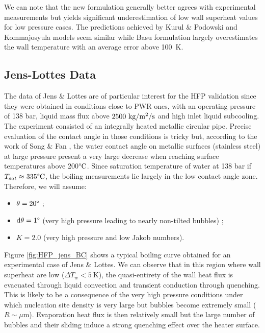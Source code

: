 \npar
We can note that the new formulation generally better agrees with experimental measurements but yields significant underestimation of low wall superheat values for low pressure cases. The predictions achieved by Kurul \& Podowski and Kommajosyula models seem similar while Basu \etal formulation largely overestimates the wall temperature with an average error above 100~K. 




\subsection{Jens-Lottes Data}
\label{subsec:HFP_verif_Jens}

The data of Jens \& Lottes are of particular interest for the HFP validation since they were obtained in conditions close to PWR ones, with an operating pressure of 138 bar, liquid mass flux above $2500\ \text{kg/m$^{2}$/s}$ and high inlet liquid subcooling. The experiment consisted of an integrally heated metallic circular pipe. Precise evaluation of the contact angle in those conditions is tricky but, according to the work of Song \& Fan \cite{song_temperature_2021}, the water contact angle on metallic surfaces (\eg stainless steel) at large pressure present a very large decrease when reaching surface temperatures above 200$\degree\mathrm{C}$. Since saturation temperature of water at 138 bar if $T_{sat} \approx 335 \degree\mathrm{C}$, the boiling measurements lie largely in the low contact angle zone. Therefore, we will assume:

\begin{itemize}
\item $\theta = 20 \degree$ ;
\item $\mathrm{d}\theta = 1 \degree$ (very high pressure leading to nearly non-tilted bubbles) ;
\item $K = 2.0$ (very high pressure and low Jakob numbers).
\end{itemize}


Figure \ref{fig:HFP_jens_BC} shows a typical boiling curve obtained for an experimental case of Jens \& Lottes. We can observe that in this region where wall superheat are low ($\Delta T_{w}<5\ $K), the quasi-entirety of the wall heat flux is evacuated through liquid convection and transient conduction through quenching. This is likely to be a consequence of the very high pressure conditions under which nucleation site density is very large but bubbles become extremely small ($R \sim \mu$m). Evaporation heat flux is then relatively small but the large number of bubbles and their sliding induce a strong quenching effect over the heater surface. 

